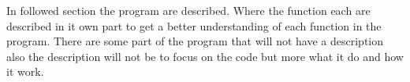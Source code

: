 In followed section the program are described. Where the function each are described in it own part to get a better understanding of each function in the program. There are some part of the program that will not have a description also the description will not be to focus on the code but more what it do and how it work.